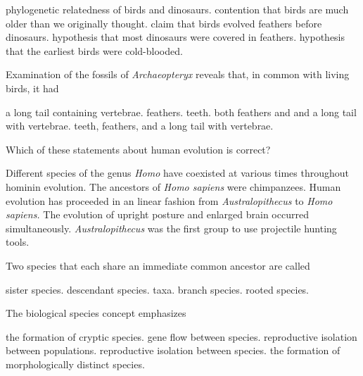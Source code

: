 \begin{choices}
\correctchoice phylogenetic relatedness of birds and dinosaurs. %
\choice contention that birds are much older than we originally thought. %
\choice claim that birds evolved feathers before dinosaurs. %
\choice hypothesis that most dinosaurs were covered in feathers. %
\choice hypothesis that the earliest birds were cold-blooded. %
\end{choices}


\question
Examination of the fossils of \textit{Archaeopteryx} reveals that, in common with living birds, it had  

\begin{choices}
\choice a long tail containing vertebrae. %
\choice feathers.  %
\choice teeth.  %
\choice both feathers and and a long tail with vertebrae.  %
\choice teeth, feathers, and a long tail with vertebrae. %
\end{choices}


\question
Which of these statements about human evolution is correct?  

\begin{choices}
\correctchoice Different species of the genus \textit{Homo} have coexisted at various times throughout hominin evolution.   %
\choice The ancestors of \textit{Homo sapiens} were chimpanzees.   %
\choice Human evolution has proceeded in an linear fashion from \textit{Australopithecus} to \textit{Homo sapiens.}   %
\choice The evolution of upright posture and enlarged brain occurred simultaneously.   %
\choice \textit{Australopithecus} was the first group to use projectile hunting tools. %
\end{choices}


\question
Two species that each share an immediate common ancestor are called

\begin{choices}
\correctchoice sister species. %
\choice descendant species. %
\choice taxa. %
\choice branch species. %
\choice rooted species. %
\end{choices}

\question
The biological species concept emphasizes

\begin{choices}
\choice the formation of cryptic species.%
\choice gene flow between species.%
\choice reproductive isolation between populations.%
\choice reproductive isolation between species.%
\choice the formation of morphologically distinct species.%
\end{choices}

